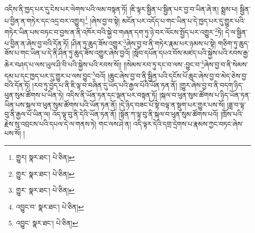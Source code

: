 འདིས་ནི་ཁྱད་པར་དུ་ངེས་པར་ལེགས་པའི་ལམ་བསྟན་ཏོ། །ཇི་ལྟར་སྦྱིན་པ་སྦྱིན་པར་བྱ་བ་ཡིན་ཞེ་ན། སྨྲས་པ། སྦྱིན་པ་བྱིན་ན་གཏེར་དང་འདྲ་བར་འགྱུར།\footnote{གྱུར།  སྣར་ཐང་།  པེ་ཅིན། } །ཞེས་བྱ་བ་སྟེ། མངོན་པར་འདོད་པ་གང་ཡིན་པ་དེ་ཁྱད་པར་དུ་གྱུར་པའི་གཏེར་ཡིན་པས་བཏང་བ་བྱས་ན་ནི་འཁོར་བའི་སྐྱེ་བ་གཞན་དག་ཏུ་ཉེ་བར་ལོངས་སྤྱོད་པར་འགྱུར་\footnote{གྱུར་  སྣར་ཐང་།  པེ་ཅིན། }ཏེ། དེ་ལ་སྦྱིན་པ་བྱིན་ན་ཞེས་བྱ་བའི་དོན་ཏོ། །ཤིན་ཏུ་ཆུད་ཟོས་འགྱུར་\footnote{གྱུར་  སྣར་ཐང་།  པེ་ཅིན། }ཞེས་བྱ་བ་ནི་གཏེར་རྣམ་པར་ཉམས་པ་སྟེ། གཅིག་ཏུ་ཆུད་ཟོས་པ་གང་ཡིན་པ་དེ་ནི་ཤིན་ཏུ་ཆུད་ཟོས་འགྱུར་ཞེས་བྱའོ། །སློབ་དཔོན་དཔའ་བོས་མཛད་པའི་སྐྱེས་པའི་རབས་རྒྱ་ཆེར་བཤད་པ་ལས་ཡུལ་ཤི་བི་པའི་སྐྱེས་པའི་རབས་སོ།། །།སེམས་རབ་ཏུ་དང་བ་ལས་:བྱུང་བ་\footnote{འབྱུང་བ་  སྣར་ཐང་།  པེ་ཅིན། }ཞེས་བྱ་བ་ནི་སེམས་དམ་པ་དང་ཁྱད་པར་དུ་གྱུར་པ་ལས་བྱུང་\footnote{འབྱུང་  སྣར་ཐང་།  པེ་ཅིན། }བའོ། །ཆུང་ཞེས་བྱ་བ་ནི་སྦྱིན་པའི་དངོས་པོ་ཆུང་ཞེས་བྱ་བ་མེད་ཅེས་བྱ་བའི་དོན་ཏོ། །རབ་ཏུ་བྱེད་པ་ནི་ཇི་ལྟ་བ་བཞིན་དུ་ཡོད་པའི་རྒྱལ་པོའི་ཡོན་ཏན་ནོ། །གྱུར་ཞེས་བྱ་བ་ནི་བདག་ཉིད་ཕུན་སུམ་ཚོགས་པ་ཡིན་ཏེ། འདིས་ནི་ཡོན་ཏན་དང་ལྡན་པར་བསྟན་ཏོ། །སྐལ་བ་ཕུན་སུམ་ཚོགས་པ་ཉིད་ཡོན་ཏན་ཡིན་པས་སྐལ་བ་ཕུན་སུམ་ཚོགས་པའི་ཡོན་ཏན་ནོ། །དེ་ཉིད་བཟང་པོ་སྟེ་བལྟ་ན་སྡུག་པར་གྱུར་པས་སོ། །ཟླ་བ་ལྟ་བུ་ནི་རྒྱལ་པོ་ཡིན་ལ། འོད་ལྟ་བུ་ནི་དེའི་ཡོན་ཏན་ནོ། །སྟོན་ཀ་ལྟ་བུ་ནི་སྐལ་བ་ཕུན་སུམ་ཚོགས་པའོ། །ཁྲོས་པའི་རྗེས་སུ་འབྲངས་པའི་དཔལ་དེ་ལ་གནས་ཏེ། གང་ལས་ཤེ་ན། འདི་ལྟར་དེའི་དགྲ་དྲེགས་པ་རྣམས་ཀྱང་བཏང་ཞེས་པས་སོ། །

